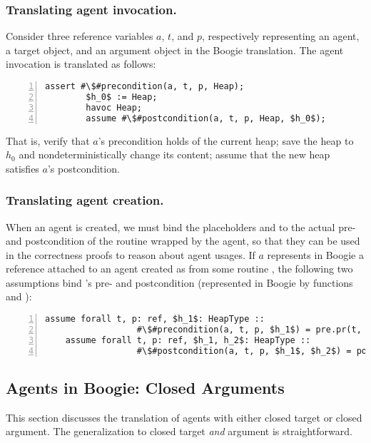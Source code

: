 \subsubsection{Translating agent invocation.}
Consider three reference variables $a$, $t$, and $p$, respectively representing an agent, a target object, and an argument object in the Boogie translation.
The agent invocation  is translated as follows:
\begin{lstlisting}[escapechar=\#,numbers=left,language=Boogie]
        assert #\$#precondition(a, t, p, Heap);
        $h_0$ := Heap;
        havoc Heap;
        assume #\$#postcondition(a, t, p, Heap, $h_0$);
\end{lstlisting} 
That is, verify that $a$'s precondition holds of the current heap; save the heap to $h_0$ and nondeterministically change its content; assume that the new heap satisfies $a$'s postcondition.



\subsubsection{Translating agent creation.}
When an agent is created, we must bind the placeholders  and  to the actual pre- and postcondition of the routine wrapped by the agent, so that they can be used in the correctness proofs to reason about agent usages.
If $a$ represents in Boogie a reference attached to an agent created as  from some routine , the following two assumptions bind 's pre- and postcondition (represented in Boogie by functions  and ):
\begin{lstlisting}[escapechar=\#,numbers=left,language=Boogie]
    assume forall t, p: ref, $h_1$: HeapType :: 
                  #\$#precondition(a, t, p, $h_1$) = pre.pr(t, p, $h_1$);
    assume forall t, p: ref, $h_1, h_2$: HeapType :: 
                  #\$#postcondition(a, t, p, $h_1$, $h_2$) = post.pr(t, p, $h_1$, $h_2$);
\end{lstlisting} 




\subsection{Agents in Boogie: Closed Arguments}\label{reasoning_closed_arg}
This section discusses the translation of agents with either closed target or closed argument.
The generalization to closed target \emph{and} argument is straightforward.


